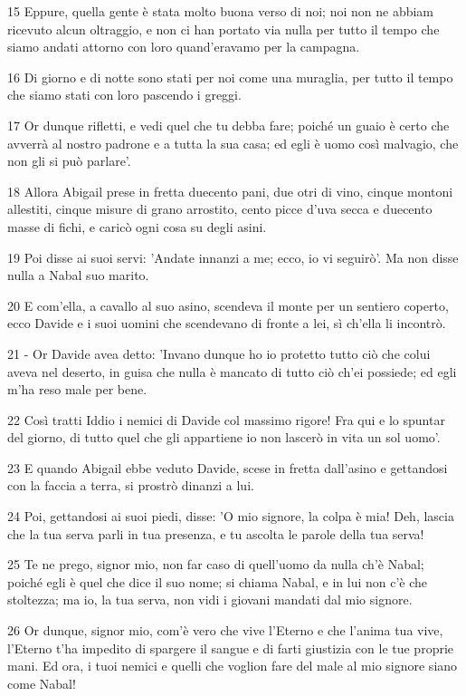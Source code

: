 \par 15 Eppure, quella gente è stata molto buona verso di noi; noi non ne abbiam ricevuto alcun oltraggio, e non ci han portato via nulla per tutto il tempo che siamo andati attorno con loro quand'eravamo per la campagna.
\par 16 Di giorno e di notte sono stati per noi come una muraglia, per tutto il tempo che siamo stati con loro pascendo i greggi.
\par 17 Or dunque rifletti, e vedi quel che tu debba fare; poiché un guaio è certo che avverrà al nostro padrone e a tutta la sua casa; ed egli è uomo così malvagio, che non gli si può parlare'.
\par 18 Allora Abigail prese in fretta duecento pani, due otri di vino, cinque montoni allestiti, cinque misure di grano arrostito, cento picce d'uva secca e duecento masse di fichi, e caricò ogni cosa su degli asini.
\par 19 Poi disse ai suoi servi: 'Andate innanzi a me; ecco, io vi seguirò'. Ma non disse nulla a Nabal suo marito.
\par 20 E com'ella, a cavallo al suo asino, scendeva il monte per un sentiero coperto, ecco Davide e i suoi uomini che scendevano di fronte a lei, sì ch'ella li incontrò.
\par 21 - Or Davide avea detto: 'Invano dunque ho io protetto tutto ciò che colui aveva nel deserto, in guisa che nulla è mancato di tutto ciò ch'ei possiede; ed egli m'ha reso male per bene.
\par 22 Così tratti Iddio i nemici di Davide col massimo rigore! Fra qui e lo spuntar del giorno, di tutto quel che gli appartiene io non lascerò in vita un sol uomo'.
\par 23 E quando Abigail ebbe veduto Davide, scese in fretta dall'asino e gettandosi con la faccia a terra, si prostrò dinanzi a lui.
\par 24 Poi, gettandosi ai suoi piedi, disse: 'O mio signore, la colpa è mia! Deh, lascia che la tua serva parli in tua presenza, e tu ascolta le parole della tua serva!
\par 25 Te ne prego, signor mio, non far caso di quell'uomo da nulla ch'è Nabal; poiché egli è quel che dice il suo nome; si chiama Nabal, e in lui non c'è che stoltezza; ma io, la tua serva, non vidi i giovani mandati dal mio signore.
\par 26 Or dunque, signor mio, com'è vero che vive l'Eterno e che l'anima tua vive, l'Eterno t'ha impedito di spargere il sangue e di farti giustizia con le tue proprie mani. Ed ora, i tuoi nemici e quelli che voglion fare del male al mio signore siano come Nabal!
